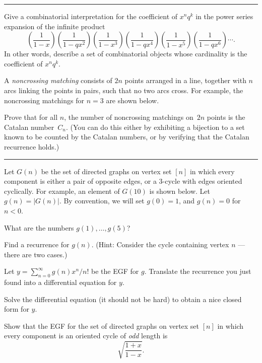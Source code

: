 \bigskip\hrule

 Give a combinatorial interpretation for the coefficient of $x^nq^k$ in the power series expansion of the infinite product
\[\left(\frac{1}{1-x}\right) \left(\frac{1}{1-qx^2}\right)
\left(\frac{1}{1-x^3}\right) \left(\frac{1}{1-qx^4}\right)
\left(\frac{1}{1-x^5}\right) \left(\frac{1}{1-qx^6}\right)\cdots.\]
In other words, describe a set of combinatorial objects whose cardinality is the coefficient of $x^nq^k$.

\pagebreak

 A \emph{noncrossing matching} consists of $2n$ points arranged in a line, together with $n$ arcs linking the points in pairs, such that no two arcs cross.  For example, the noncrossing matchings for $n=3$ are shown below.


Prove that for all $n$, the number of noncrossing matchings on~$2n$ points is the Catalan number~$C_n$.  (You can do this either by exhibiting a bijection to a set known to be counted by the Catalan numbers, or by verifying that the Catalan recurrence holds.)

\bigskip\hrule


\prob Let $G(n)$ be the set of directed graphs on vertex set $[n]$ in which every component is either a pair of opposite edges, or a 3-cycle with edges oriented cyclically.  For example, an element of $G(10)$ is shown below.
Let $g(n)=|G(n)|$.  By convention, we will set $g(0)=1$, and $g(n)=0$ for $n<0$.

 What are the numbers $g(1),\dots,g(5)$?

 Find a recurrence for $g(n)$.  (Hint: Consider the cycle containing vertex $n$ --- there are two cases.)

 Let $y=\sum_{n=0}^\infty g(n) x^n/n!$ be the EGF for $g$.
Translate the recurrence you just found into a differential equation for $y$.

 Solve the differential equation (it should not be hard) to obtain a nice closed form for $y$.

 Show that the EGF for the set of directed graphs on vertex set $[n]$ in which every component is an oriented cycle of \emph{odd} length is
\[\sqrt{\frac{1+x}{1-x}}.\]

